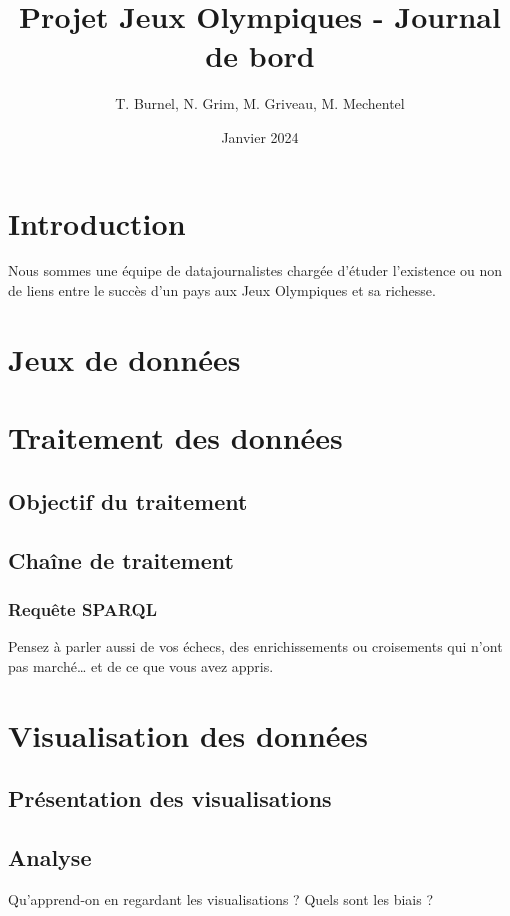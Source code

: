 \documentclass[12pt]{report}
\title{Projet Jeux Olympiques - Journal de bord}
\date{Janvier 2024}
\author{T. Burnel, N. Grim, M. Griveau, M. Mechentel}
\begin{document}
	\maketitle
	
	\section{Introduction}
	
	Nous sommes une équipe de datajournalistes chargée d'étuder l'existence ou non de liens entre le succès d'un pays aux Jeux Olympiques et sa richesse.
	
	\section{Jeux de données}	
	
	\section{Traitement des données}
	
		\subsection{Objectif du traitement}
		
		\subsection{Chaîne de traitement}
		
			\subsubsection{Requête SPARQL}
		
		Pensez à parler aussi de vos échecs, des enrichissements ou croisements qui n’ont pas marché… et de ce que vous avez appris.
	
	\section{Visualisation des données}
	
		\subsection{Présentation des visualisations}
		
		\subsection{Analyse}
		
		Qu'apprend-on en regardant les visualisations ? Quels sont les biais ?


	\tableofcontents
\end{document}
